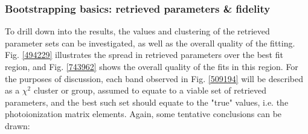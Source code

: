 \begin{enumerate}
\end{enumerate}


\subsubsection{Bootstrapping basics: retrieved parameters \& fidelity}

To drill down into the results, the values and clustering of the retrieved parameter sets can be investigated, as well as the overall quality of the fitting. Fig. \ref{494229} illustrates the spread in retrieved parameters over the best fit region, and Fig. \ref{743962} shows the overall quality of the fits in this region. For the purposes of discussion, each band observed in Fig. \ref{509194} will be described as a $\chi^2$ cluster or group, assumed to equate to a viable set of retrieved parameters, and the best such set should equate to the "true" values, i.e. the photoionization matrix elements. Again, some tentative conclusions can be drawn:

